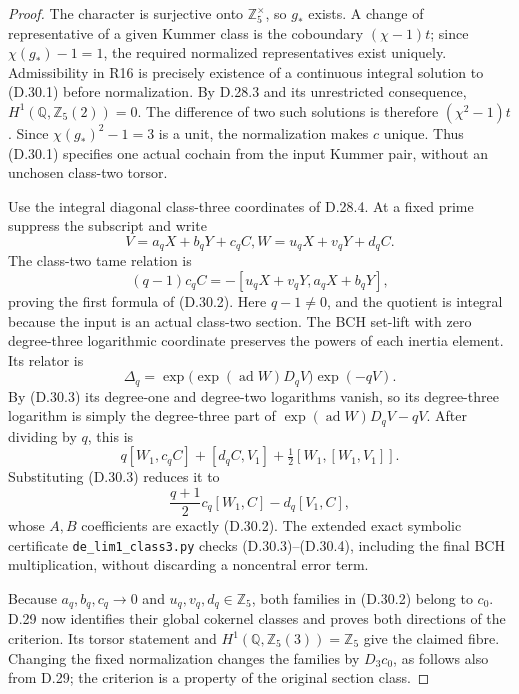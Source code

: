 \begin{proof}
The character is surjective onto
\(\mathbb Z_5^\times\), so \(g_*\)
exists. A change of representative of
a given Kummer class is the coboundary
\((\chi-1)t\); since \(\chi(g_*)-1=1\),
the required normalized representatives
exist uniquely. Admissibility in R16
is precisely existence of a continuous
integral solution to (D.30.1) before
normalization. By D.28.3 and its
unrestricted consequence,
\(H^1(\mathbb Q,\mathbb Z_5(2))=0\).
The difference of two such solutions
is therefore \((\chi^2-1)t\).
Since \(\chi(g_*)^2-1=3\) is a unit,
the normalization makes \(c\) unique.
Thus (D.30.1) specifies one actual
cochain from the input Kummer pair,
without an unchosen class-two torsor.

Use the integral diagonal class-three
coordinates of D.28.4. At a fixed
prime suppress the subscript and write
\[
        V=a_qX+b_qY+c_qC,
        W=u_qX+v_qY+d_qC.
\]
The class-two tame relation is
\[
       (q-1)c_qC=-[u_qX+v_qY,a_qX+b_qY],
                                                               \tag{D.30.3}
\]
proving the first formula of (D.30.2).
Here \(q-1\ne0\), and the quotient is
integral because the input is an actual
class-two section. The BCH set-lift
with zero degree-three logarithmic
coordinate preserves the powers of
each inertia element. Its relator is
\[
 \Delta_q=
 \exp\bigl(\exp(\operatorname{ad}W)D_qV\bigr)
                       \exp(-qV).
\]
By (D.30.3) its degree-one and
degree-two logarithms vanish, so its
degree-three logarithm is simply the
degree-three part of
\(\exp(\operatorname{ad}W)D_qV-qV\).
After dividing by \(q\), this is
\[
 q[W_1,c_qC]+[d_qC,V_1]
                    +\tfrac12[W_1,[W_1,V_1]].
\]
Substituting (D.30.3) reduces it to
\[
             \frac{q+1}{2}c_q[W_1,C]
                         -d_q[V_1,C],          \tag{D.30.4}
\]
whose \(A,B\) coefficients are exactly
(D.30.2). The extended exact symbolic
certificate \texttt{de\_lim1\_class3.py}
checks (D.30.3)--(D.30.4), including
the final BCH multiplication, without
discarding a noncentral error term.

Because \(a_q,b_q,c_q\to0\) and
\(u_q,v_q,d_q\in\mathbb Z_5\), both
families in (D.30.2) belong to \(c_0\).
D.29 now identifies their global
cokernel classes and proves both
directions of the criterion. Its
torsor statement and
\(H^1(\mathbb Q,\mathbb Z_5(3))=\mathbb Z_5\)
give the claimed fibre. Changing the
fixed normalization changes the
families by \(D_3c_0\), as follows
also from D.29; the criterion is a
property of the original section class.
\end{proof}

